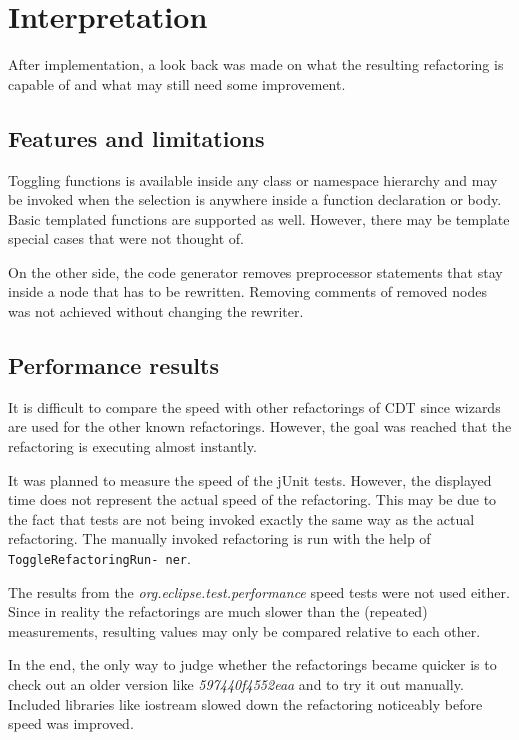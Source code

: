 \chapter{Interpretation}
\thispagestyle{fancy}

After implementation, a look back was made on what the resulting refactoring is 
capable of and what may still need some improvement.

\section{Features and limitations}

Toggling functions is available inside any class or namespace hierarchy and may 
be invoked when the selection is anywhere inside a function declaration or body. 
Basic templated functions are supported as well. However, there may be 
template special cases that were not thought of.

On the other side, the code generator removes preprocessor statements that stay 
inside a node that has to be rewritten. Removing comments of removed nodes was 
not achieved without changing the rewriter.

\section{Performance results}

It is difficult to compare the speed with other refactorings of CDT since wizards 
are used for the other known refactorings. However, the goal was reached that 
the refactoring is executing almost instantly.

It was planned to measure the speed of the jUnit tests. However, the displayed 
time does not represent the actual speed of the refactoring. This may be due to 
the fact that tests are not being invoked exactly the same way as the actual 
refactoring. The manually invoked refactoring is run with the help of \texttt{ToggleRefactoringRun- ner}.

The results from the \textit{org.eclipse.test.performance} speed tests were not 
used either. Since in reality the refactorings are much slower than the 
(repeated) measurements, resulting values may only be compared relative to each 
other.

In the end, the only way to judge whether the refactorings became quicker is to 
check out an older version like \textit{597440f4552eaa} and to try it out 
manually. Included libraries like iostream slowed down the refactoring 
noticeably before speed was improved.

